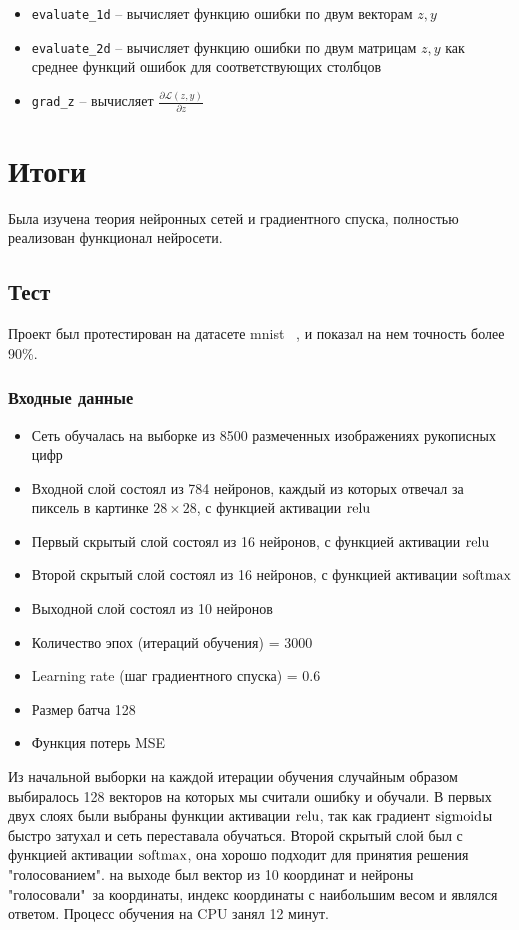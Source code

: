 \documentclass{article}
\begin{document}
\begin{itemize}
    \item \texttt{evaluate\_1d} -- вычисляет функцию ошибки по двум векторам $z, y$
    \item \texttt{evaluate\_2d} -- вычисляет функцию ошибки по двум матрицам $z, y$ как среднее функций ошибок для соответствующих столбцов
    \item \texttt{grad\_z} -- вычисляет $\frac{\partial \mathscr{L}(z, y)}{\partial z}$
\end{itemize}

\section{Итоги}

Была изучена теория нейронных сетей и градиентного спуска, полностью реализован функционал нейросети.
\subsection*{Тест}
Проект был протестирован на датасете mnist ~\cite{mnist}, и показал на нем точность более 90\%.
\subsubsection*{Входные данные}
\begin{itemize}
    \item Сеть обучалась на выборке из 8500 размеченных изображениях рукописных цифр
    \item Входной слой состоял из 784 нейронов, каждый из которых отвечал за пиксель в картинке $28 \times 28$, с функцией активации $\operatorname{relu}$
    \item Первый скрытый слой состоял из 16 нейронов, с функцией активации $\operatorname{relu}$
    \item Второй скрытый слой состоял из 16 нейронов, с функцией активации $\operatorname{softmax}$
    \item Выходной слой состоял из 10 нейронов
    \item Количество эпох (итераций обучения) = 3000
    \item Learning rate (шаг градиентного спуска) = 0.6
    \item Размер батча 128
    \item Функция потерь MSE
\end{itemize}

Из начальной выборки на каждой итерации обучения случайным образом выбиралось 128 векторов на которых мы считали ошибку и обучали. В первых двух слоях были выбраны функции активации $\operatorname{relu}$, так как градиент $\operatorname{sigmoid}$ы быстро затухал и сеть переставала обучаться. Второй скрытый слой был с функцией активации $\operatorname{softmax}$, она хорошо подходит для принятия решения "голосованием". на выходе был вектор из 10 координат и нейроны "голосовали"\ за координаты, индекс координаты с наибольшим весом и являлся ответом. Процесс обучения на CPU занял 12 минут.
\end{document}
